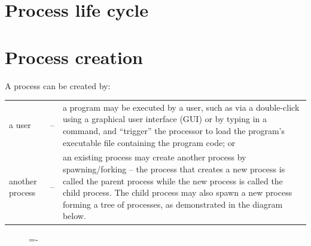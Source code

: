 \documentclass[a4paper]{systems-software}
\begin{document}
\section{Process life cycle}

\section*{Process creation}

A process can be created by:

\begin{longtabu} to \textwidth {X[3,l] X[1,c] X[10,l]}
	\textbullet a user & -- & a program may be executed by a user, such as via a double-click using a graphical user interface (GUI) or by typing in a command, and “trigger” the processor to load the program’s executable file containing the program code; or
	\\
	\textbullet another process & -- & an existing process may create another process by spawning/forking – the process that creates a new process is called the parent process while the new process is called the child process. The child process may also spawn a new process forming a tree of processes, as demonstrated in the diagram below.
\end{longtabu}

\begin{figure}[H]
  \lineskip=-\fboxrule
\end{figure}
\end{document}
